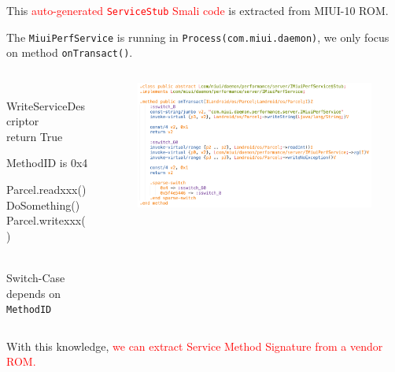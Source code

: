 \documentclass[notheorems, aspectratio=54]{beamer}
\begin{document}
\begin{frame}
	
	This \textcolor{red}{auto-generated \texttt{ServiceStub} Smali code} is extracted from MIUI-10 ROM. 
	
	The \texttt{MiuiPerfService} is running in \texttt{Process(com.miui.daemon)}, we only focus on method \texttt{onTransact()}.
	
	\begin{columns}
		\begin{column}{0.2\textwidth}
			\\[6ex]
			\tiny{
				WriteServiceDescriptor
				\\[2ex]
				return True
			}
			\\[4ex]
			\tiny{
				MethodID is 0x4
				
				Parcel.readxxx()
				DoSomething()
				Parcel.writexxx()
			}
			\\[4ex]
			\tiny{
				Switch-Case depends on \texttt{MethodID}
			}
		\end{column}
		\begin{column}{0.8\textwidth}
			\begin{figure}
				\begin{flushleft}
					\includegraphics[width=\textwidth]{res/aidl-example-stub.png}
				\end{flushleft}
			\end{figure}
		\end{column}
	\end{columns}
	
	With this knowledge, \textcolor{red}{we can extract Service Method Signature from a vendor ROM.} 

\end{frame}
\end{document}
